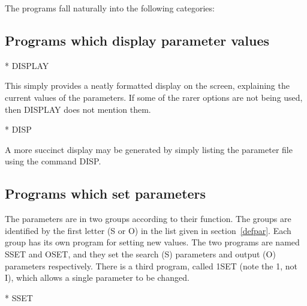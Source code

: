 The programs fall naturally into the following categories:
\subsection{Programs which display parameter values}
* DISPLAY

This simply provides a neatly formatted display on the screen, explaining the
current values of the parameters.
If some of the rarer options are not being used, then DISPLAY does not mention
them.

* DISP

A more succinct display may be generated by simply listing the parameter file
using the command DISP.
\subsection{Programs which set parameters}
\label{setpar}
The parameters are in two groups according to their function.
The groups are identified by the first letter (S or O) in the list given in
section~\ref{defpar}.
Each group has its own program for setting new values.
The two programs are named SSET and OSET, and they set the search (S) parameters
and output (O) parameters respectively.
There is a third program, called 1SET (note the 1, not I), which allows a
single parameter to be changed.

* SSET

